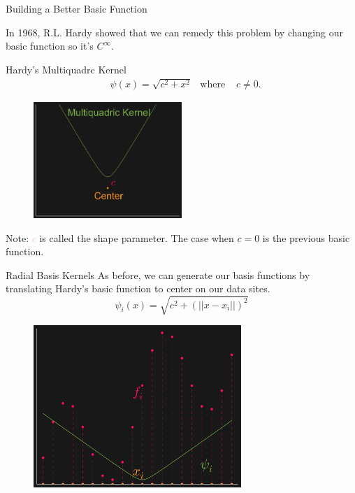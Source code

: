 \documentclass[12pt,t]{beamer}
\newcommand{\subt}[1]{{\footnotesize \color{subtitle} {#1}}}
\begin{document}
\begin{frame}{Building a Better Basic Function}

In 1968, R.L. Hardy showed that we can remedy this problem by changing our basic function so it's $C^\infty$.

\subt{Hardy's Multiquadrc Kernel}
\begin{align*}
&\psi(x)=\sqrt{c^2 + x^2} &\text{where   } &c \neq 0.
\end{align*}


\begin{figure}
\includegraphics[width=0.5\textwidth, keepaspectratio]{kernelfun.png}
\end{figure}

\subt{Note:} \textcolor{pink}{$c$} is called the shape parameter. The case when $c=0$ is 
 the previous basic function.

\note{}
\end{frame}

\begin{frame}{Radial Basis Kernels}
As before, we can generate our basis functions by translating Hardy's basic function to center on our data sites.
\begin{equation*}
\psi_i(x)=\sqrt{c^2 + (||x-x_i||)^2}
\end{equation*}
\begin{figure}
\includegraphics[width=0.7\textwidth, keepaspectratio]{kernelbasis.png}
\end{figure}

\note{}
\end{frame}
\end{document}

